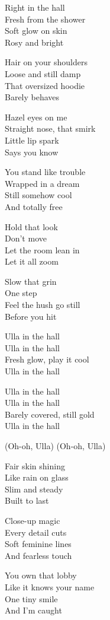 \begin{lyrics}
Right in the hall\\
Fresh from the shower\\
Soft glow on skin\\
Rosy and bright

Hair on your shoulders\\
Loose and still damp\\
That oversized hoodie\\
Barely behaves

Hazel eyes on me\\
Straight nose, that smirk\\
Little lip spark\\
Says you know

You stand like trouble\\
Wrapped in a dream\\
Still somehow cool\\
And totally free

Hold that look\\
Don’t move\\
Let the room lean in\\
Let it all zoom

Slow that grin\\
One step\\
Feel the hush go still\\
Before you hit

Ulla in the hall\\
Ulla in the hall\\
Fresh glow, play it cool\\
Ulla in the hall

Ulla in the hall\\
Ulla in the hall\\
Barely covered, still gold\\
Ulla in the hall

(Oh-oh, Ulla)
(Oh-oh, Ulla)

Fair skin shining\\
Like rain on glass\\
Slim and steady\\
Built to last

Close-up magic\\
Every detail cuts\\
Soft feminine lines\\
And fearless touch

You own that lobby\\
Like it knows your name\\
One tiny smile\\
And I’m caught


\end{lyrics}
